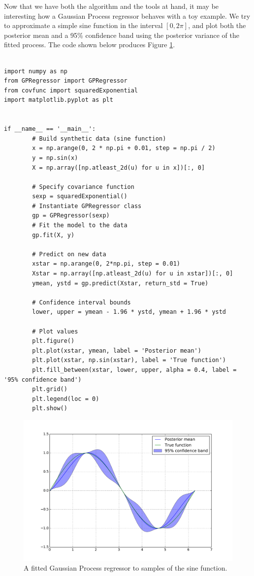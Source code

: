\documentclass[10pt,a4paper,twoside]{book}
\begin{document}
Now that we have both the algorithm and the tools at hand, it may be interesting how a Gaussian Process regressor behaves with a toy example. We try to approximate a simple sine function in the interval $[0, 2\pi]$, and plot both the posterior mean and a 95\% confidence band using the posterior variance of the fitted process. The code shown below produces Figure \ref{fig:GPsine}.

\newpage

\begin{verbatim}

import numpy as np
from GPRegressor import GPRegressor
from covfunc import squaredExponential
import matplotlib.pyplot as plt


if __name__ == '__main__':
        # Build synthetic data (sine function)
        x = np.arange(0, 2 * np.pi + 0.01, step = np.pi / 2)
        y = np.sin(x)
        X = np.array([np.atleast_2d(u) for u in x])[:, 0]

        # Specify covariance function
        sexp = squaredExponential()
        # Instantiate GPRegressor class
        gp = GPRegressor(sexp)
        # Fit the model to the data
        gp.fit(X, y)

        # Predict on new data
        xstar = np.arange(0, 2*np.pi, step = 0.01)
        Xstar = np.array([np.atleast_2d(u) for u in xstar])[:, 0]
        ymean, ystd = gp.predict(Xstar, return_std = True)

        # Confidence interval bounds
        lower, upper = ymean - 1.96 * ystd, ymean + 1.96 * ystd

        # Plot values
        plt.figure()
        plt.plot(xstar, ymean, label = 'Posterior mean')
        plt.plot(xstar, np.sin(xstar), label = 'True function')
        plt.fill_between(xstar, lower, upper, alpha = 0.4, label = '95% confidence band')
        plt.grid()
        plt.legend(loc = 0)
        plt.show()
\end{verbatim}

\begin{figure}
\caption{A fitted Gaussian Process regressor to samples of the sine function.}
\label{fig:GPsine}
\includegraphics[width=\textwidth]{figures/chapter2/GPsine}
\end{figure}
\end{document}
